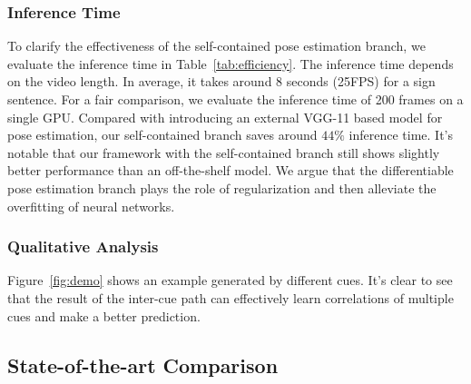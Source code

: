 \documentclass[letterpaper]{article} %
\begin{document}
\subsubsection{Inference Time}
To clarify the effectiveness of the self-contained pose estimation branch, we evaluate the inference time in Table~\ref{tab:efficiency}. The inference time depends on the video length. In average, it takes around 8 seconds (25FPS) for a sign sentence. For a fair comparison, we evaluate the inference time of 200 frames on a single GPU. Compared with introducing an external VGG-11 based model for pose estimation, our self-contained branch saves around $44\%$ inference time. It's notable that our framework with the self-contained branch still shows slightly better performance than an off-the-shelf model. We argue that the differentiable pose estimation branch plays the role of regularization and then alleviate the overfitting of neural networks.

\subsubsection{Qualitative Analysis}
Figure~\ref{fig:demo} shows an example generated by different cues. It's clear to see that the result of the inter-cue path can effectively learn correlations of multiple cues and make a better prediction.

\subsection{State-of-the-art Comparison}
\end{document}
